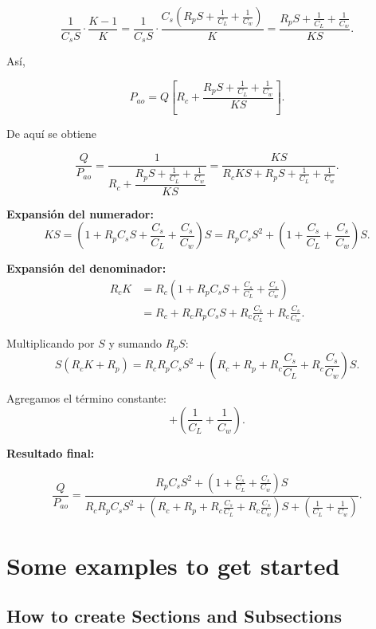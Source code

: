 \documentclass{article}
\begin{document}
\begin{equation}
\frac{1}{C_s S}\cdot \frac{K-1}{K}
= \frac{1}{C_s S}\cdot \frac{C_s\left(R_p S + \tfrac{1}{C_L} + \tfrac{1}{C_w}\right)}{K}
= \frac{R_p S + \tfrac{1}{C_L} + \tfrac{1}{C_w}}{K S}.
\end{equation}

Así,

\begin{equation}
P_{ao} = Q\left[ R_c + \frac{R_p S + \tfrac{1}{C_L} + \tfrac{1}{C_w}}{K S}\right].
\end{equation}

De aquí se obtiene

\begin{equation}
\frac{Q}{P_{ao}} = \frac{1}{R_c + \dfrac{R_p S + \tfrac{1}{C_L} + \tfrac{1}{C_w}}{K S}}
= \frac{K S}{R_c K S + R_p S + \tfrac{1}{C_L} + \tfrac{1}{C_w}}.
\end{equation}

\bigskip
\textbf{Expansión del numerador:}
\[
K S = \left(1 + R_p C_s S + \frac{C_s}{C_L} + \frac{C_s}{C_w}\right)S
= R_p C_s S^2 + \left(1 + \frac{C_s}{C_L} + \frac{C_s}{C_w}\right)S.
\]

\textbf{Expansión del denominador:}
\begin{align}
R_c K &= R_c\left(1 + R_p C_s S + \frac{C_s}{C_L} + \frac{C_s}{C_w}\right) \\
&= R_c + R_c R_p C_s S + R_c\frac{C_s}{C_L} + R_c\frac{C_s}{C_w}.
\end{align}

Multiplicando por $S$ y sumando $R_p S$:
\[
S(R_c K + R_p) = R_c R_p C_s S^2 + \left(R_c + R_p + R_c\frac{C_s}{C_L} + R_c\frac{C_s}{C_w}\right)S.
\]

Agregamos el término constante:
\[
+ \left(\frac{1}{C_L} + \frac{1}{C_w}\right).
\]

\bigskip
\textbf{Resultado final:}

\begin{equation}
\frac{Q}{P_{ao}} =
\frac{R_p C_s S^2 + \left(1 + \tfrac{C_s}{C_L} + \tfrac{C_s}{C_w}\right)S}
{R_c R_p C_s S^2
+ \left(R_c + R_p + R_c\tfrac{C_s}{C_L} + R_c\tfrac{C_s}{C_w}\right)S
+ \left(\tfrac{1}{C_L} + \tfrac{1}{C_w}\right)}.
\end{equation}

\section{Some examples to get started}

\subsection{How to create Sections and Subsections}
\end{document}
